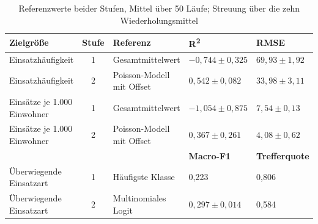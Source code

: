 
\begin{table}[htbp]
    \centering
    \caption{Referenzwerte beider Stufen, Mittel über 50 Läufe; Streuung über die zehn Wiederholungsmittel}
    \label{tab:baselines}
    \footnotesize
    \singlespacing
    \setlength{\tabcolsep}{5pt}
    \begin{tabularx}{\textwidth}{@{}>{\raggedright\arraybackslash}p{3.9cm} c >{\raggedright\arraybackslash}X l l@{}}
        \toprule
        \textbf{Zielgröße} & \textbf{Stufe} & \textbf{Referenz} & \textbf{R\textsuperscript{2}} & \textbf{RMSE} \\
        \midrule
        Einsatzhäufigkeit & 1 & Gesamtmittelwert & $-0{,}744 \pm 0{,}325$ & $69{,}93 \pm 1{,}92$ \\
        Einsatzhäufigkeit & 2 & Poisson-Modell mit Offset & $0{,}542 \pm 0{,}082$ & $33{,}98 \pm 3{,}11$ \\
        Einsätze je 1.000 Einwohner & 1 & Gesamtmittelwert & $-1{,}054 \pm 0{,}875$ & $7{,}54 \pm 0{,}13$ \\
        Einsätze je 1.000 Einwohner & 2 & Poisson-Modell mit Offset & $0{,}367 \pm 0{,}261$ & $4{,}08 \pm 0{,}62$ \\
        \midrule
        & & & \textbf{Macro-F1} & \textbf{Trefferquote} \\
        \cmidrule(l){4-5}
        Überwiegende Einsatzart & 1 & Häufigste Klasse & 0,223 & 0,806 \\
        Überwiegende Einsatzart & 2 & Multinomiales Logit & $0{,}297 \pm 0{,}014$ & 0,584 \\
        \bottomrule
    \end{tabularx}
\end{table}

